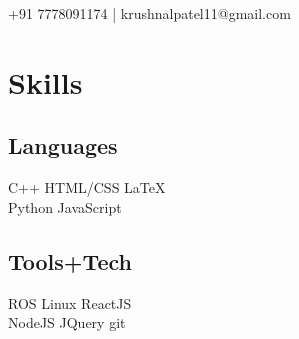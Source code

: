 \documentclass[letterpaper]{deedy-resume} %
\begin{document}


{ +91 7778091174 | krushnalpatel11@gmail.com }

\begin{minipage}[t]{0.33\textwidth} %

\section{Skills}

\subsection{Languages}
C++ \hspace{0.1cm} \textbullet \hspace{0.1cm}
HTML/CSS \hspace{0.1cm} \textbullet \hspace{0.1cm}
\LaTeX{}\\
Python\hspace{0.1cm} \textbullet \hspace{0.1cm}
JavaScript %

\vspace{0.3cm}

\subsection{Tools+Tech}
ROS \hspace{0.1cm} \textbullet \hspace{0.1cm}
Linux \hspace{0.1cm} \textbullet \hspace{0.1cm}
ReactJS \\
NodeJS \hspace{0.1cm} \textbullet \hspace{0.1cm}
JQuery \hspace{0.1cm} \textbullet \hspace{0.1cm}
git
\vspace{0.3cm}


\end{minipage}
\end{document}
